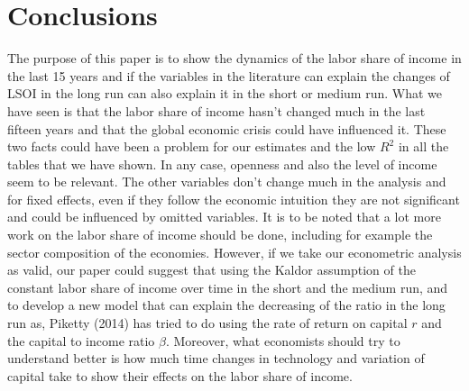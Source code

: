 \documentclass[12pt, letterpaper]{article}
\numberwithin{table}{section}   %
\begin{document}
\section{Conclusions}\label{Conclusions}
The purpose of this paper is to show the dynamics of the labor share of income in the last 15 years and if the variables in the literature can explain the changes of LSOI in the long run can also explain it in the short or medium run. What we have seen is that the labor share of income hasn't changed much in the last fifteen years and that the global economic crisis could have influenced it. These two facts could have been a problem for our estimates and the low $R^2$ in all the tables that we have shown. In any case, openness and also the level of income seem to be relevant. The other variables don't change much in the analysis and for fixed effects, even if they follow the economic intuition they are not significant and could be influenced by omitted variables. It is to be noted that a lot more work on the labor share of income should be done, including for example the sector composition of the economies. However, if we take our econometric analysis as valid, our paper could suggest that using the Kaldor assumption of the constant labor share of income over time in the short and the medium run, and to develop a new model that can explain the decreasing of the ratio in the long run as, Piketty (2014) has tried to do using the rate of return on capital $r$ and the capital to income ratio $\beta$. Moreover, what economists should try to understand better is how much time changes in technology and variation of capital take to show their effects on the labor share of income.


\clearpage
\end{document}
